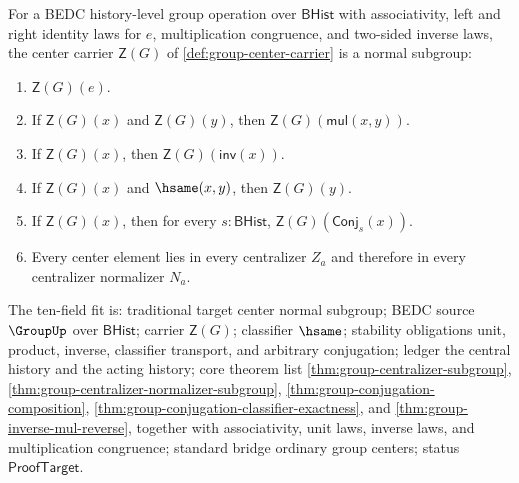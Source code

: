 \begin{theorem}
\label{thm:group-center-normal-subgroup}
For a BEDC history-level group operation over $\mathsf{BHist}$ with
associativity, left and right identity laws for $e$, multiplication
congruence, and two-sided inverse laws, the center carrier
$\mathsf{Z}(G)$ of \autoref{def:group-center-carrier} is a normal subgroup:
\begin{enumerate}
\item $\mathsf{Z}(G)(e)$.
\item If $\mathsf{Z}(G)(x)$ and $\mathsf{Z}(G)(y)$, then
$\mathsf{Z}(G)(\mathsf{mul}(x,y))$.
\item If $\mathsf{Z}(G)(x)$, then $\mathsf{Z}(G)(\mathsf{inv}(x))$.
\item If $\mathsf{Z}(G)(x)$ and $\hsame(x,y)$, then $\mathsf{Z}(G)(y)$.
\item If $\mathsf{Z}(G)(x)$, then for every $s:\mathsf{BHist}$,
$\mathsf{Z}(G)(\mathsf{Conj}_s(x))$.
\item Every center element lies in every centralizer $Z_a$ and therefore in
every centralizer normalizer $N_a$.
\end{enumerate}
The ten-field fit is: traditional target center normal subgroup; BEDC source
$\GroupUp$ over $\mathsf{BHist}$; carrier $\mathsf{Z}(G)$; classifier $\hsame$;
stability obligations unit, product, inverse, classifier transport, and
arbitrary conjugation; ledger the central history and the acting history; core
theorem list \autoref{thm:group-centralizer-subgroup},
\autoref{thm:group-centralizer-normalizer-subgroup},
\autoref{thm:group-conjugation-composition},
\autoref{thm:group-conjugation-classifier-exactness}, and
\autoref{thm:group-inverse-mul-reverse}, together with associativity, unit
laws, inverse laws, and multiplication congruence; standard bridge ordinary
group centers; status $\mathsf{ProofTarget}$.
\end{theorem}
